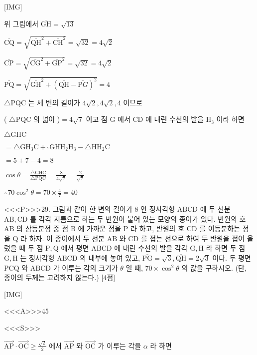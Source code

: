 \documentclass{oblivoir}
\begin{document}
[IMG]

위 그림에서 $\overline{\mathrm{GH}}=\sqrt{13}$

$\overline{\mathrm{CQ}}=\sqrt{\overline{\mathrm{QH}}^{2}+\overline{\mathrm{CH}}^{2}}=\sqrt{32}=4 \sqrt{2}$

$\overline{\mathrm{CP}}=\sqrt{\overline{\mathrm{CG}}^{2}+\overline{\mathrm{GP}}^{2}}=\sqrt{32}=4 \sqrt{2}$

$\overline{\mathrm{PQ}}=\sqrt{\overline{\mathrm{GH}}^{2}+(\overline{\mathrm{QH}}-\overline{\mathrm{P} G})^{2}}=4$

$\triangle \mathrm{P} \mathrm{QC}$ 는 세 변의 길이가 $4 \sqrt{2}, 4 \sqrt{2}, 4$ 이므로

( $\triangle \mathrm{PQC}$ 의 넓이 )$=4 \sqrt{7}$ 이고 점 $\mathrm{G}$ 에서 $\overline{\mathrm{CD}}$ 에 내린 수선의 발을 $\mathrm{H}_{3}$ 이라 하면

$\triangle \mathrm{GHC}$

$=\triangle \mathrm{GH}_{3} \mathrm{C}+\square \mathrm{GHH}_{2} \mathrm{H}_{3}-\triangle \mathrm{HH}_{2} \mathrm{C}$

$=5+7-4=8$

$\cos \theta=\frac{\triangle \mathrm{GHC}}{\triangle \mathrm{P} \mathrm{QC}}=\frac{8}{4 \sqrt{7}}=\frac{2}{\sqrt{7}}$

$\therefore 70 \cos ^{2} \theta=70 \times \frac{4}{7}=40$


<<<P>>>29. 그림과 같이 한 변의 길이가 8 인 정사각형 $\mathrm{ABCD}$ 에 두 선분 $\mathrm{AB}, \mathrm{CD}$ 를 각각 지름으로 하는 두 반원이 붙어 있는 모양의 종이가 있다. 반원의 호 $\mathrm{AB}$ 의 삼등분점 중 점 $\mathrm{B}$ 에 가까운 점을 $\mathrm{P}$ 라 하고, 반원의 호 $\mathrm{CD}$ 를 이등분하는 점을 $\mathrm{Q}$ 라 하자. 이 종이에서 두 선분 $\mathrm{AB}$ 와 $\mathrm{CD}$ 를 접는 선으로 하여 두 반원을 접어 올렀을 때 두 점 $\mathrm{P}, \mathrm{Q}$ 에서 평면 $\mathrm{ABCD}$ 에 내린 수선의 발을 각각 $\mathrm{G}, \mathrm{H}$ 라 하면 두 점 $\mathrm{G}, \mathrm{H}$ 는 정사각형 $\mathrm{ABCD}$ 의 내부에 놓여 있고, $\overline{\mathrm{PG}}=\sqrt{3}, \overline{\mathrm{QH}}=2 \sqrt{3}$ 이다. 두 평면 $\mathrm{PCQ}$ 와 $\mathrm{ABCD}$ 가 이루는 각의 크기가 $\theta$ 일 때, $70 \times \cos ^{2} \theta$ 의 값을 구하시오. (단, 종이의 두께는 고려하지 않는다.) [4점]


[IMG]


<<<A>>>$45$

<<<S>>>



$\overrightarrow{\mathrm{AP}} \cdot \overrightarrow{\mathrm{OC}} \geq \frac{\sqrt{2}}{2}$ 에서 $\overrightarrow{\mathrm{AP}}$ 와 $\overrightarrow{\mathrm{OC}}$ 가 이루는
각을 $\alpha$ 라 하면
\end{document}
